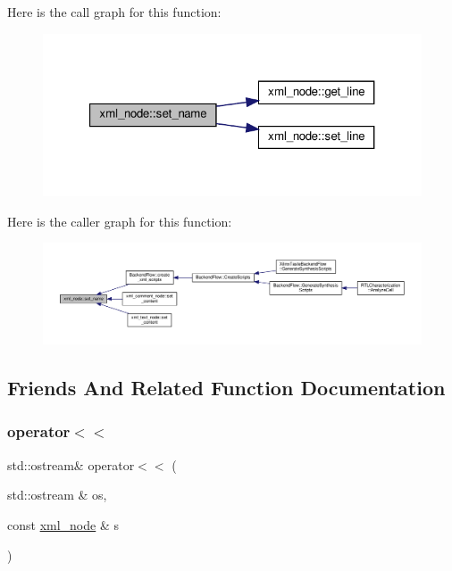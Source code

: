 Here is the call graph for this function\+:
\nopagebreak
\begin{figure}[H]
\begin{center}
\leavevmode
\includegraphics[width=321pt]{d1/dc3/classxml__node_afdc073fc5ee6b09e636a6d9da116a091_cgraph}
\end{center}
\end{figure}
Here is the caller graph for this function\+:
\nopagebreak
\begin{figure}[H]
\begin{center}
\leavevmode
\includegraphics[width=350pt]{d1/dc3/classxml__node_afdc073fc5ee6b09e636a6d9da116a091_icgraph}
\end{center}
\end{figure}


\subsection{Friends And Related Function Documentation}
\mbox{\label{classxml__node_a7233e8e22aa1f77f4928d7c9a0101f18}} 
\subsubsection{\texorpdfstring{operator$<$$<$}{operator<<}\hspace{0.1cm}{\footnotesize\ttfamily [1/3]}}
{\footnotesize\ttfamily std\+::ostream\& operator$<$$<$ (\begin{DoxyParamCaption}\item[{std\+::ostream \&}]{os,  }\item[{const \hyperlink{classxml__node}{xml\+\_\+node} \&}]{s }\end{DoxyParamCaption})\hspace{0.3cm}{\ttfamily [friend]}}



